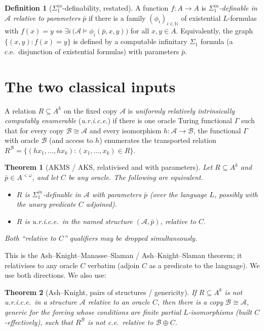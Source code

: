 \documentclass{article}
\newcommand{\N}{\mathbb{N}}
\newcommand{\A}{\mathcal{A}}
\newcommand{\B}{\mathcal{B}}
\newcommand{\Sin}{\Sigma^{in}_1}
\theoremstyle{plain}
\newtheorem{theorem}{Theorem}
\theoremstyle{definition}
\newtheorem{definition}{Definition}
\begin{document}
\begin{definition}[$\Sin$-definability, restated]\label{def:sigma}
A function $f:A\to A$ is \emph{$\Sin$-definable in $\A$ relative to parameters}
$\bar p$ if there is a family $(\phi_i)_{i\in\N}$ of existential $L$-formulas with
$f(x)=y\iff\exists i\,\big(\A\models\phi_i(\bar p,x,y)\big)$ for all $x,y\in A$.
Equivalently, the graph $\{(x,y):f(x)=y\}$ is defined by a computable infinitary
$\Sigma_1$ formula (a c.e.\ disjunction of existential formulas) with parameters
$\bar p$.
\end{definition}

\section{The two classical inputs}

A relation $R\subseteq A^k$ on the fixed copy $\A$ is \emph{uniformly relatively
intrinsically computably enumerable} (\emph{u.r.i.c.e.}) if there is one oracle Turing
functional $\Gamma$ such that for every copy $\B\cong\A$ and every isomorphism
$h:\A\to\B$, the functional $\Gamma$ with oracle $\B$ (and access to $h$) enumerates
the transported relation $R^\B=\{(h x_1,\dots,h x_k):(x_1,\dots,x_k)\in R\}$.

\begin{theorem}[AKMS / AKS, relativised and with parameters]\label{thm:aks}
Let $R\subseteq A^k$ and $\bar p\in A^{<\omega}$, and let $C$ be any oracle. The
following are equivalent.
\begin{itemize}
\item[(i)] $R$ is $\Sin$-definable in $\A$ with parameters $\bar p$ (over the language
$L$, possibly with the unary predicate $C$ adjoined).
\item[(ii)] $R$ is u.r.i.c.e.\ in the named structure $(\A,\bar p)$, relative to $C$.
\end{itemize}
Both ``relative to $C$'' qualifiers may be dropped simultaneously.
\end{theorem}

\noindent This is the Ash--Knight--Manasse--Slaman / Ash--Knight--Slaman theorem; it
relativises to any oracle $C$ verbatim (adjoin $C$ as a predicate to the language).
We use both directions. We also use:

\begin{theorem}[Ash--Knight, pairs of structures / genericity]\label{thm:pairs}
If $R\subseteq A^k$ is \emph{not} u.r.i.c.e.\ in a structure $\A$ relative to an oracle
$C$, then there is a copy $\B\cong\A$, generic for the forcing whose conditions are
finite partial $L$-isomorphisms (built $C$-effectively), such that $R^\B$ is
\emph{not} c.e.\ relative to $\B\oplus C$.
\end{theorem}
\end{document}

